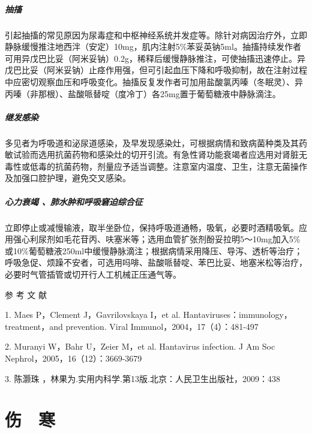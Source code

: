 \paragraph{抽搐}

引起抽搐的常见原因为尿毒症和中枢神经系统并发症等。除针对病因治疗外，立即静脉缓慢推注地西泮（安定）10mg，肌内注射5\%苯妥英钠5ml。抽搐持续发作者可用异戊巴比妥（阿米妥钠）0.2g，稀释后缓慢静脉推注，可使抽搐迅速停止。异戊巴比妥（阿米妥钠）止痉作用强，但可引起血压下降和呼吸抑制，故在注射过程中应密切观察血压和呼吸变化。抽搐反复发作者可加用盐酸氯丙嗪（冬眠灵）、异丙嗪（非那根）、盐酸哌替啶（度冷丁）各25mg置于葡萄糖液中静脉滴注。

\paragraph{继发感染}

多见者为呼吸道和泌尿道感染，及早发现感染灶，可根据病情和致病菌种类及其药敏试验而选用抗菌药物和感染灶的切开引流。有急性肾功能衰竭者应选用对肾脏无毒性或低毒的抗菌药物，剂量应予适当调整。注意室内温度、卫生，注意无菌操作及加强口腔护理，避免交叉感染。

\paragraph{心力衰竭 、肺水肿和呼吸窘迫综合征}

立即停止或减慢输液，取半坐卧位，保持呼吸道通畅，吸氧，必要时酒精吸氧。应用强心利尿剂如毛花苷丙、呋塞米等；选用血管扩张剂酚妥拉明5～10mg加入5\%或10\%葡萄糖液250ml中缓慢静脉滴注；根据病情采用降压、导泻、透析等治疗；呼吸急促、烦躁不安者，可选用吗啡、盐酸哌替啶、苯巴比妥、地塞米松等治疗，必要时气管插管或切开行人工机械正压通气等。

\protect\hypertarget{text00224.html}{}{}

\hypertarget{text00224.htmlux5cux23CHP7-7-4}{}
参 考 文 献

1. Maes P，Clement J，Gavrilovskaya I，et al.
Hantaviruses：immunology，treatment，and prevention. Viral
Immunol，2004，17（4）：481-497

2. Muranyi W，Bahr U，Zeier M，et al. Hantavirus infection. J Am Soc
Nephrol，2005，16（12）：3669-3679

3. 陈灏珠 ，林果为.实用内科学.第13版.北京：人民卫生出版社，2009：438

\protect\hypertarget{text00225.html}{}{}

\chapter{伤　寒}

